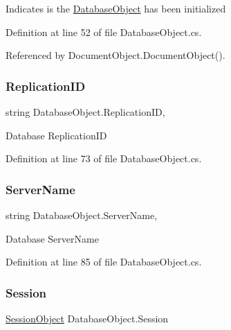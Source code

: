 Indicates is the \hyperlink{class_database_object}{Database\+Object} has been initialized 



Definition at line 52 of file Database\+Object.\+cs.



Referenced by Document\+Object.\+Document\+Object().

\mbox{\label{class_database_object_aaa091ee1a9a86d2d10fe2381ee2d1f4c}} 
\subsubsection{\texorpdfstring{Replication\+ID}{ReplicationID}}
{\footnotesize\ttfamily string Database\+Object.\+Replication\+ID\hspace{0.3cm}{\ttfamily [get]}, {\ttfamily [set]}}



Database Replication\+ID 



Definition at line 73 of file Database\+Object.\+cs.

\mbox{\label{class_database_object_ad6bfcd30152f7a115ac5a1c7fbfa9fcb}} 
\subsubsection{\texorpdfstring{Server\+Name}{ServerName}}
{\footnotesize\ttfamily string Database\+Object.\+Server\+Name\hspace{0.3cm}{\ttfamily [get]}, {\ttfamily [set]}}



Database Server\+Name 



Definition at line 85 of file Database\+Object.\+cs.

\mbox{\label{class_database_object_aa8484162b7d2a7c4c9426bca13c64c07}} 
\subsubsection{\texorpdfstring{Session}{Session}}
{\footnotesize\ttfamily \hyperlink{class_session_object}{Session\+Object} Database\+Object.\+Session\hspace{0.3cm}{\ttfamily [get]}}



